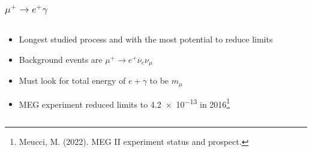 \documentclass[11pt]{beamer}
\begin{document}
\begin{frame}
    \frametitle{$\mu^+ \rightarrow e^+ \gamma$}
    \begin{columns}[c]
        \begin{column}{0.6\textwidth}
            \begin{itemize}
                \item Longest studied process and with the most potential to reduce limits
                \item Background events are $\mu^+ \rightarrow e^+ \overline{\nu}_e \nu_\mu$ 
                \item Must look for total energy of $e +\gamma$ to be $m_\mu$
                \item MEG experiment reduced limits to \num{4.2e-13} in 2016\footnote[frame]{Meucci, M. (2022). MEG II experiment status and prospect.}
            \end{itemize}
        \end{column}

        \begin{column}{0.4\textwidth}
            
        \end{column}
    \end{columns}
    

\end{frame}
\end{document}
